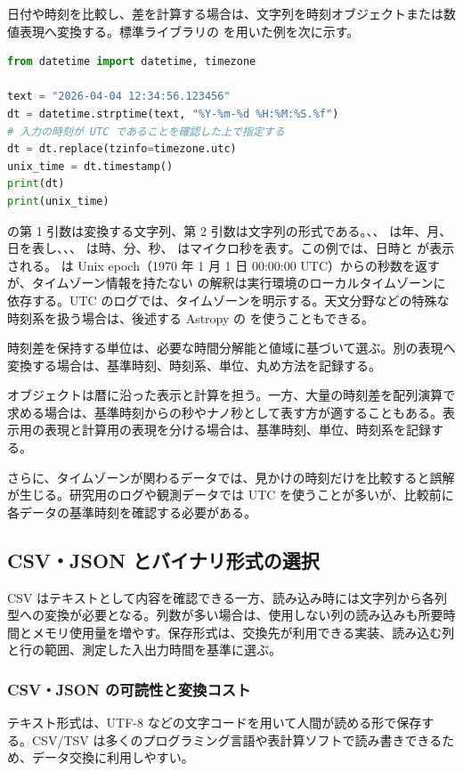 日付や時刻を比較し、差を計算する場合は、文字列を時刻オブジェクトまたは数値表現へ変換する。標準ライブラリの  を用いた例を次に示す。

\begin{lstlisting}[language=Python]
from datetime import datetime, timezone

text = "2026-04-04 12:34:56.123456"
dt = datetime.strptime(text, "%Y-%m-%d %H:%M:%S.%f")
# 入力の時刻が UTC であることを確認した上で指定する
dt = dt.replace(tzinfo=timezone.utc)
unix_time = dt.timestamp()
print(dt)
print(unix_time)
\end{lstlisting}

 の第 1 引数は変換する文字列、第 2 引数は文字列の形式である。、、 は年、月、日を表し、、、 は時、分、秒、 はマイクロ秒を表す。この例では、日時と  が表示される。 は Unix epoch（1970 年 1 月 1 日 00:00:00 UTC）からの秒数を返すが、タイムゾーン情報を持たない  の解釈は実行環境のローカルタイムゾーンに依存する。UTC のログでは、タイムゾーンを明示する。天文分野などの特殊な時刻系を扱う場合は、後述する Astropy の  を使うこともできる。

時刻差を保持する単位は、必要な時間分解能と値域に基づいて選ぶ。別の表現へ変換する場合は、基準時刻、時刻系、単位、丸め方法を記録する。

 オブジェクトは暦に沿った表示と計算を担う。一方、大量の時刻差を配列演算で求める場合は、基準時刻からの秒やナノ秒として表す方が適することもある。表示用の表現と計算用の表現を分ける場合は、基準時刻、単位、時刻系を記録する。

さらに、タイムゾーンが関わるデータでは、見かけの時刻だけを比較すると誤解が生じる。研究用のログや観測データでは UTC を使うことが多いが、比較前に各データの基準時刻を確認する必要がある。


\subsection{CSV・JSON とバイナリ形式の選択}

CSV はテキストとして内容を確認できる一方、読み込み時には文字列から各列型への変換が必要となる。列数が多い場合は、使用しない列の読み込みも所要時間とメモリ使用量を増やす。保存形式は、交換先が利用できる実装、読み込む列と行の範囲、測定した入出力時間を基準に選ぶ。

\subsubsection{CSV・JSON の可読性と変換コスト}
テキスト形式は、UTF-8 などの文字コードを用いて人間が読める形で保存する。CSV/TSV は多くのプログラミング言語や表計算ソフトで読み書きできるため、データ交換に利用しやすい。

